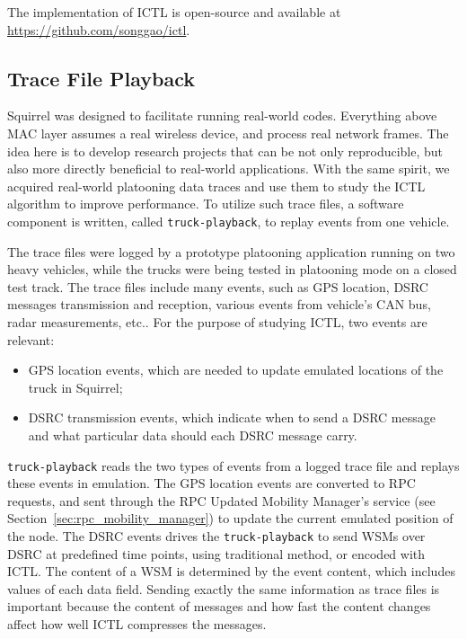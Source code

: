 \documentclass[12pt]{report}
\begin{document}
The implementation of ICTL is open-source and available at \url{https://github.com/songgao/ictl}.

\subsection{Trace File Playback}
\label{sec:truck_playback}

Squirrel was designed to facilitate running real-world codes. Everything above MAC layer assumes a real wireless device, and process real network frames. The idea here is to develop research projects that can be not only reproducible, but also more directly beneficial to real-world applications. With the same spirit, we acquired real-world platooning data traces and use them to study the ICTL algorithm to improve performance. To utilize such trace files, a software component is written, called \texttt{truck-playback}, to replay events from one vehicle.

The trace files were logged by a prototype platooning application running on two heavy vehicles, while the trucks were being tested in platooning mode on a closed test track. The trace files include many events, such as GPS location, DSRC messages transmission and reception, various events from vehicle's CAN bus, radar measurements, etc.. For the purpose of studying ICTL, two events are relevant:

\begin{itemize}
  \item GPS location events, which are needed to update emulated locations of the truck in Squirrel;
  \item DSRC transmission events, which indicate when to send a DSRC message and what particular data should each DSRC message carry.
\end{itemize}

\texttt{truck-playback} reads the two types of events from a logged trace file and replays these events in emulation. The GPS location events are converted to RPC requests, and sent through the RPC Updated Mobility Manager's service (see Section~\ref{sec:rpc_mobility_manager}) to update the current emulated position of the node. The DSRC events drives the \texttt{truck-playback} to send WSMs over DSRC at predefined time points, using traditional method, or encoded with ICTL. The content of a WSM is determined by the event content, which includes values of each data field. Sending exactly the same information as trace files is important because the content of messages and how fast the content changes affect how well ICTL compresses the messages.
\end{document}
